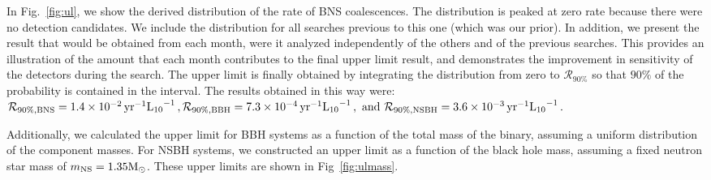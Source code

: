 In Fig.~\ref{fig:ul}, we show the derived distribution of the rate of
\ac{BNS} coalescences. The distribution is peaked at zero rate
because there were no detection candidates.  We include the distribution for
all searches previous to this one (which was our prior).  In addition, we
present the result that would be obtained from each month, were it
analyzed independently of the others and of the previous searches.  This
provides an illustration of the amount that each month contributes to
the final upper limit result, and demonstrates the improvement in
sensitivity of the detectors during the search.  The upper limit is
finally obtained by integrating the distribution from zero to
$\mathcal{R}_{90\%}$ so that $90\%$ of the probability is contained in the
interval.  The results obtained in this way were:
%
$\mathcal{R}_{90\%,{\rm BNS}} = 1.4 \times 10^{-2}\,
\textrm{yr}^{-1}\mathrm{L_{10}}^{-1} \, ,
\mathcal{R}_{90\%,{\rm BBH}} = 7.3 \times 10^{-4}\,
\textrm{yr}^{-1}\mathrm{L_{10}}^{-1} \, , \text{ and }
\mathcal{R}_{90\%,{\rm NSBH}} =  3.6 \times 10^{-3}\,
\textrm{yr}^{-1}\mathrm{L_{10}}^{-1} \, .$


Additionally, we calculated the upper limit for BBH systems as a function of
the total mass of the binary, assuming a uniform distribution of the component
masses.  For \ac{NSBH} systems, we constructed an upper limit as a function of
the black hole mass, assuming a fixed neutron star mass of $m_{\mathrm{NS}} =
1.35 \mathrm{M_\odot}$.  These upper limits are shown in Fig~\ref{fig:ulmass}.

